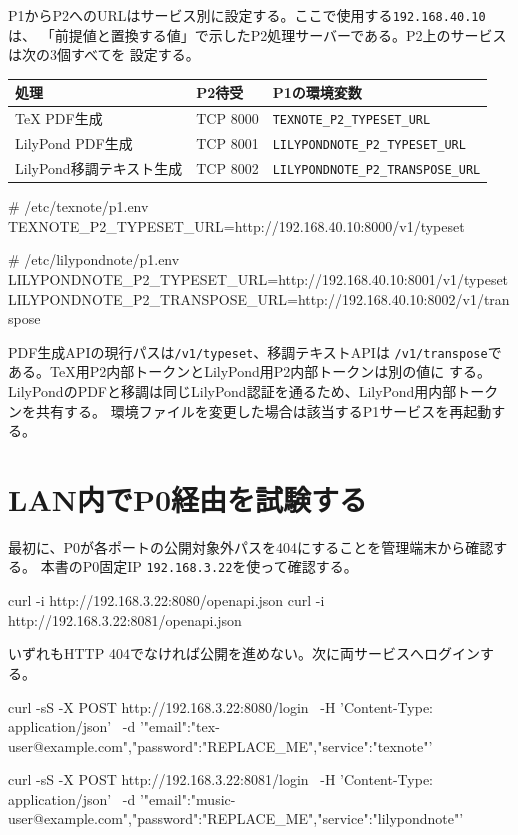 \documentclass[uplatex,a4paper,11pt]{jsarticle}
\begin{document}
P1からP2へのURLはサービス別に設定する。ここで使用する\texttt{192.168.40.10}は、
「前提値と置換する値」で示したP2処理サーバーである。P2上のサービスは次の3個すべてを
設定する。

\begin{longtable}{@{}p{43mm}p{28mm}p{68mm}@{}}
\toprule
処理 & P2待受 & P1の環境変数\\
\midrule
TeX PDF生成 & TCP 8000 & \texttt{TEXNOTE\_P2\_TYPESET\_URL}\\
LilyPond PDF生成 & TCP 8001 & \texttt{LILYPONDNOTE\_P2\_TYPESET\_URL}\\
LilyPond移調テキスト生成 & TCP 8002 & \texttt{LILYPONDNOTE\_P2\_TRANSPOSE\_URL}\\
\bottomrule
\end{longtable}

\begin{command}
# /etc/texnote/p1.env
TEXNOTE_P2_TYPESET_URL=http://192.168.40.10:8000/v1/typeset

# /etc/lilypondnote/p1.env
LILYPONDNOTE_P2_TYPESET_URL=http://192.168.40.10:8001/v1/typeset
LILYPONDNOTE_P2_TRANSPOSE_URL=http://192.168.40.10:8002/v1/transpose
\end{command}

PDF生成APIの現行パスは\texttt{/v1/typeset}、移調テキストAPIは
\texttt{/v1/transpose}である。TeX用P2内部トークンとLilyPond用P2内部トークンは別の値に
する。LilyPondのPDFと移調は同じLilyPond認証を通るため、LilyPond用内部トークンを共有する。
環境ファイルを変更した場合は該当するP1サービスを再起動する。

\section{LAN内でP0経由を試験する}

最初に、P0が各ポートの公開対象外パスを404にすることを管理端末から確認する。
本書のP0固定IP \texttt{192.168.3.22}を使って確認する。

\begin{command}
curl -i http://192.168.3.22:8080/openapi.json
curl -i http://192.168.3.22:8081/openapi.json
\end{command}

いずれもHTTP 404でなければ公開を進めない。次に両サービスへログインする。

\begin{command}
curl -sS -X POST http://192.168.3.22:8080/login \
  -H 'Content-Type: application/json' \
  -d '{"email":"tex-user@example.com","password":"REPLACE_ME","service":"texnote"}'

curl -sS -X POST http://192.168.3.22:8081/login \
  -H 'Content-Type: application/json' \
  -d '{"email":"music-user@example.com","password":"REPLACE_ME","service":"lilypondnote"}'
\end{command}
\end{document}
